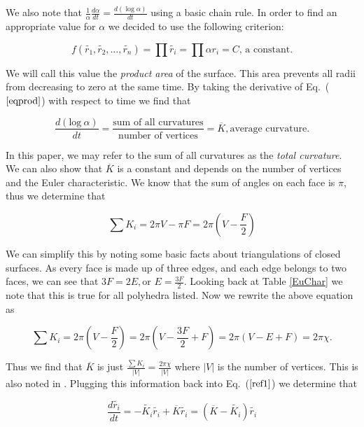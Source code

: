 \documentclass[12pt]{article}
\begin{document}
 We also note that $\displaystyle \frac{1}{\alpha} \frac{d\alpha}{dt} = \frac{d(\log \alpha)}{dt}$ using a basic chain rule. In order to find an appropriate value for $\alpha$ we decided to use the following criterion:
 
\begin{equation}
\label{eqprod}
f(\tilde{r_1},\tilde{r_2},\ldots,\tilde{r_n}) = \prod{\tilde{r_i}} = \prod{\alpha r_i} = C\mbox{, a constant.}
\end{equation}

 We will call this value the \textit{product area} of the surface. This area prevents all radii from decreasing to zero at the same time. By taking the derivative of Eq.~($\ref{eqprod}$) with respect to time we find that 
 
\begin{equation}
\label{proof1}
\frac{d(\mbox{log}~\alpha)}{dt} = \frac{\mbox{sum of all curvatures}}{\mbox{number of vertices}} = \overline{K}, \mbox{average curvature.}
\end{equation}

 In this paper, we may refer to the sum of all curvatures as the \textit{total curvature}. We can also show that $\overline{K}$ is a constant and depends on the number of vertices and the Euler characteristic. We know that the sum of angles on each face is $\pi$, thus we determine that 

$$\sum{K_i} = 2\pi V - \pi F = 2\pi(V - \frac{F}{2})$$

 We can simplify this by noting some basic facts about triangulations of closed surfaces. As every face is made up of three edges, and each edge belongs to two faces, we can see that $3F = 2E, \mbox{or } E = \frac{3F}{2}$. Looking back at Table \ref{EuChar} we note that this is true for all polyhedra listed. Now we rewrite the above equation as

$$\sum{K_i} = 2\pi(V - \frac{F}{2}) = 2\pi(V - \frac{3F}{2} + F) = 2\pi(V - E + F) = 2\pi \chi.$$

 Thus we find that $\overline{K}$ is just $\displaystyle\frac{\sum{K_i}}{|V|} = \frac{2\pi \chi}{|V|}$ where $|V|$ is the number of vertices. This is also noted in \cite{chowluo}. Plugging this information back into Eq.~($\ref{ref1}$) we determine that

\begin{equation}
\frac{d\tilde{r_i}}{dt} = -\tilde{K_i}\tilde{r_i} + \overline{K}\tilde{r_i} = (\overline{K} - \tilde{K_i})\tilde{r_i}
\end{equation}
\end{document}
